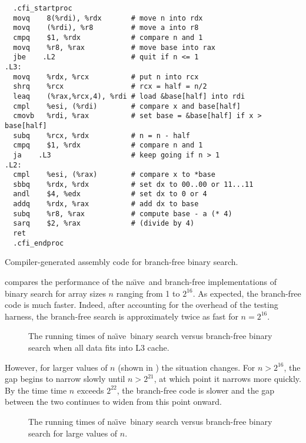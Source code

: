 \documentclass{patmorin}
\newcommand{\lstlabel}[1]{\label{lst:#1}}
\newcommand{\naive}{na\"{\i}ve}
\begin{document}
\begin{listing}
\begin{verbatim}
  .cfi_startproc
  movq    8(%rdi), %rdx       # move n into rdx
  movq    (%rdi), %r8         # move a into r8
  cmpq    $1, %rdx            # compare n and 1
  movq    %r8, %rax           # move base into rax
  jbe    .L2                  # quit if n <= 1
.L3:
  movq    %rdx, %rcx          # put n into rcx
  shrq    %rcx                # rcx = half = n/2
  leaq    (%rax,%rcx,4), %rdi # load &base[half] into rdi
  cmpl    %esi, (%rdi)        # compare x and base[half]
  cmovb   %rdi, %rax          # set base = &base[half] if x > base[half]
  subq    %rcx, %rdx          # n = n - half
  cmpq    $1, %rdx            # compare n and 1
  ja    .L3                   # keep going if n > 1
.L2:
  cmpl    %esi, (%rax)        # compare x to *base
  sbbq    %rdx, %rdx          # set dx to 00..00 or 11...11
  andl    $4, %edx            # set dx to 0 or 4 
  addq    %rdx, %rax          # add dx to base
  subq    %r8, %rax           # compute base - a (* 4)
  sarq    $2, %rax            # (divide by 4)
  ret
  .cfi_endproc
\end{verbatim}
\caption{Compiler-generated assembly code for branch-free binary search.}
\lstlabel{bfbs-asm}
\end{listing}

 compares the performance of the \naive\ and
branch-free implementations of binary search for array sizes $n$
ranging from 1 to $2^{16}$.  As expected, the branch-free code is much
faster. Indeed, after accounting for the overhead of the testing harness,
the branch-free search is approximately twice as fast for $n=2^{16}$.

\begin{figure}
   \caption{The running times of \naive\ binary search versus
    branch-free binary search when all data
    fits into L3 cache.}
\end{figure}

However, for larger values of $n$ (shown in ) the
situation changes.  For $n>2^{16}$, the gap begins to narrow slowly
until $n>2^{21}$, at which point it narrows more quickly.  By the time
time $n$ exceeds $2^{22}$, the branch-free code is slower and the gap
between the two continues to widen from this point onward.

\begin{figure}
   \caption{The running times of \naive\ binary search versus
    branch-free binary search for large values of $n$.}
\end{figure}
\end{document}
